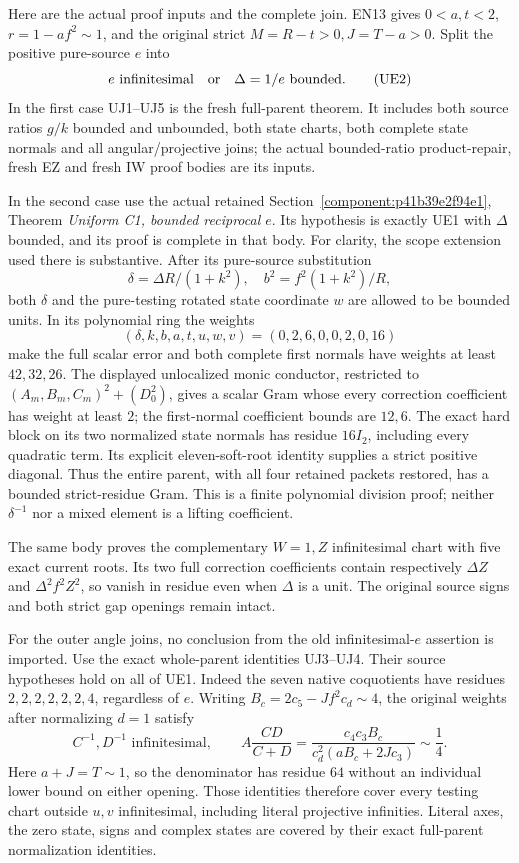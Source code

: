 Here are the actual proof inputs and the complete join.  EN13 gives
\(0<a,t<2\), \(r=1-af^2\sim1\), and the original strict
\(M=R-t>0,J=T-a>0\).  Split the positive pure-source \(e\) into
\[
 e\text{ infinitesimal}\quad\hbox{or}\quad \Delta=1/e\text{ bounded}.
 \tag{UE2}
\]
In the first case UJ1--UJ5 is the fresh full-parent theorem.  It
includes both source ratios \(g/k\) bounded and unbounded, both
state charts, both complete state normals and all angular/projective
joins; the actual bounded-ratio product-repair, fresh EZ and fresh
IW proof bodies are its inputs.

In the second case use the actual retained
Section~\ref{component:p41b39e2f94e1}, Theorem \emph{Uniform C1, bounded
reciprocal \(e\)}.  Its hypothesis is exactly UE1 with
\(\Delta\) bounded, and its proof is complete in that body.
For clarity, the scope extension used there is substantive.
After its pure-source substitution
\[
 \delta=\Delta R/(1+k^2),\quad b^2=f^2(1+k^2)/R,
\]
both \(\delta\) and the pure-testing rotated state coordinate \(w\)
are allowed to be bounded units.  In its polynomial ring the weights
\[
 (\delta,k,b,a,t,u,w,v)=(0,2,6,0,0,2,0,16)
 \tag{UE3}
\]
make the full scalar error and both complete first normals have weights
at least \(42,32,26\).  The displayed unlocalized monic conductor,
restricted to \((A_m,B_m,C_m)^2+(D_0^2)\), gives a scalar Gram
whose every correction coefficient has weight at least \(2\);
the first-normal coefficient bounds are \(12,6\).
The exact hard block on its two normalized state normals has
residue \(16I_2\), including every quadratic term.  Its explicit
eleven-soft-root identity supplies a strict positive diagonal.
Thus the entire parent, with all four retained packets restored,
has a bounded strict-residue Gram.  This is a finite polynomial
division proof; neither \(\delta^{-1}\) nor a mixed element is a
lifting coefficient.

The same body proves the complementary \(W=1,Z\) infinitesimal
chart with five exact current roots.  Its two full correction
coefficients contain respectively \(\Delta Z\) and
\(\Delta^2 f^2Z^2\), so vanish in residue even when \(\Delta\)
is a unit.  The original source signs and both strict gap openings
remain intact.

For the outer angle joins, no conclusion from the old infinitesimal-\(e\)
assertion is imported.  Use the exact whole-parent identities UJ3--UJ4.
Their source hypotheses hold on all of UE1.  Indeed the seven native
coquotients have residues \(2,2,2,2,2,2,4\), regardless of \(e\).
Writing \(B_c=2c_5-Jf^2c_d\sim4\), the original weights after
normalizing \(d=1\) satisfy
\[
 C^{-1},D^{-1}\text{ infinitesimal},\qquad
 A\frac{CD}{C+D}
 =\frac{c_4c_3B_c}{c_d^2(aB_c+2Jc_3)}\sim\frac14.
 \tag{UE4}
\]
Here \(a+J=T\sim1\), so the denominator has residue \(64\)
without an individual lower bound on either opening.
Those identities therefore cover every testing chart outside
\(u,v\) infinitesimal, including literal projective infinities.
Literal axes, the zero state, signs and complex states are covered
by their exact full-parent normalization identities.

